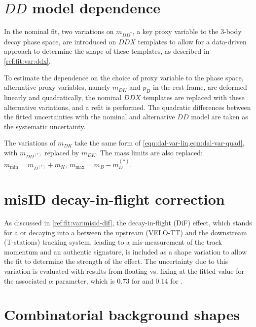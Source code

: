 

\section{$DD$ model dependence}
\label{sys-model-ddx}

In the nominal fit, two variations on $m_{DD^{*}}$,
a key proxy variable to the 3-body decay phase space,
are introduced on $DDX$ templates to allow for a data-driven approach to
determine the shape of these templates, as described in
\cref{ref:fit:var:ddx}.

To estimate the dependence on the choice of proxy variable to the phase space,
alternative proxy variables, namely $m_{DK}$ and $p_D$ in the \B rest frame,
are deformed linearly and quadratically,
the nominal $DDX$ templates are replaced with these alternative variations,
and a refit is performed.
The quadratic differences between the fitted uncertainties with the nominal and
alternative $DD$ model are taken as the systematic uncertainty.

The variations of $m_{DK}$ take the same form of
\cref{eqn:dal-var-lin,eqn:dal-var-quad}, with $m_{DD^{(*)}}$ replaced by
$m_{DK}$.
The mass limits are also replaced:
$m_\text{min} = m_{D^{(*)}} + m_K$, $m_\text{max} = m_B - m_D^{(*)}$.


\section{\muon misID decay-in-flight correction}
\label{sys-model-dif}

As discussed in \cref{ref:fit:var:misid-dif},
the decay-in-flight (DiF) effect,
which stands for a \kaon or \pion decaying into a \muon between the upstream
(VELO-TT) and the downstream (T-stations) tracking system,
leading to a mis-measurement of the track momentum and an authentic \muon
signature,
is included as a shape variation to allow the fit to determine
the strength of the effect.
The uncertainty due to this variation is evaluated with results
from floating vs. fixing at the fitted value for the associated $\alpha$
parameter,
which is 0.73 for \RD and 0.14 for \RDst.


\section{Combinatorial background shapes}
\label{sys-model-comb}

